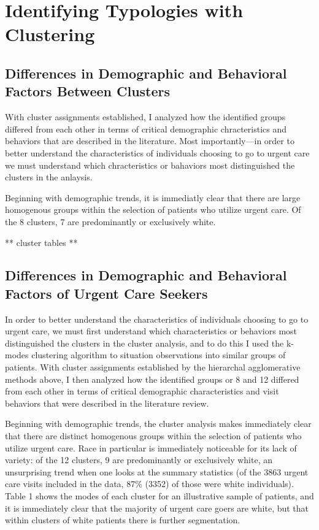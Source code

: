 \documentclass[12pt,twoside]{reedthesis}
\begin{document}
  \section{Identifying Typologies with
  Clustering}\label{identifying-typologies-with-clustering}
  
  \subsection{Differences in Demographic and Behavioral Factors Between
  Clusters}\label{differences-in-demographic-and-behavioral-factors-between-clusters}
  
  With cluster assignments established, I analyzed how the identified
  groups differed from each other in terms of critical demographic
  chracteristics and behaviors that are described in the literature. Most
  importantly---in order to better understand the characteristics of
  individuals choosing to go to urgent care we must understand which
  chracteristics or bahaviors most distinguished the clusters in the
  anlaysis.
  
  Beginning with demographic trends, it is immediatly clear that there are
  large homogenous groups within the selection of patients who utilize
  urgent care. Of the 8 clusters, 7 are predominantly or exclusively
  white.
  
  ** cluster tables **
  
  \subsection{Differences in Demographic and Behavioral Factors of Urgent
  Care
  Seekers}\label{differences-in-demographic-and-behavioral-factors-of-urgent-care-seekers}
  
  In order to better understand the characteristics of individuals
  choosing to go to urgent care, we must first understand which
  characteristics or behaviors most distinguished the clusters in the
  cluster analysis, and to do this I used the k-modes clustering algorithm
  to situation observations into similar groups of patients. With cluster
  assignments established by the hierarchal agglomerative methods above, I
  then analyzed how the identified groups or 8 and 12 differed from each
  other in terms of critical demographic characteristics and visit
  behaviors that were described in the literature review.
  
  Beginning with demographic trends, the cluster analysis makes
  immediately clear that there are distinct homogenous groups within the
  selection of patients who utilize urgent care. Race in particular is
  immediately noticeable for its lack of variety: of the 12 clusters, 9
  are predominantly or exclusively white, an unsurprising trend when one
  looks at the summary statistics (of the 3863 urgent care visits included
  in the data, 87\% (3352) of those were white individuals). Table 1 shows
  the modes of each cluster for an illustrative sample of patients, and it
  is immediately clear that the majority of urgent care goers are white,
  but that within clusters of white patients there is further
  segmentation.
  
\end{document}
